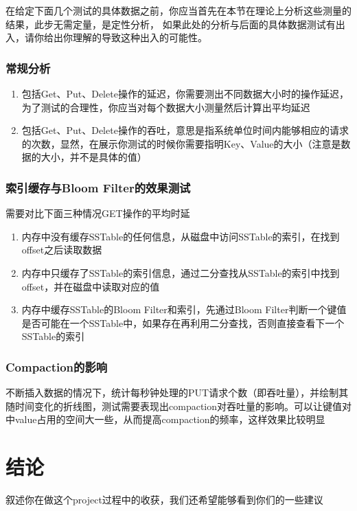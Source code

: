 \documentclass[fontset=windows]{article}
\begin{document}
在给定下面几个测试的具体数据之前，你应当首先在本节在理论上分析这些测量的结果，此步无需定量，是定性分析，
如果此处的分析与后面的具体数据测试有出入，请你给出你理解的导致这种出入的可能性。

\subsubsection{常规分析}


\begin{enumerate}
    \item 包括Get、Put、Delete操作的延迟，你需要测出不同数据大小时的操作延迟，为了测试的合理性，你应当对每个数据大小测量然后计算出平均延迟
    \item 包括Get、Put、Delete操作的吞吐，意思是指系统单位时间内能够相应的请求的次数，显然，在展示你测试的时候你需要指明Key、Value的大小（注意是数据的大小，并不是具体的值）
\end{enumerate}


\subsubsection{索引缓存与Bloom Filter的效果测试}
需要对比下面三种情况GET操作的平均时延
\begin{enumerate}
    \item 内存中没有缓存SSTable的任何信息，从磁盘中访问SSTable的索引，在找到offset之后读取数据
    \item 内存中只缓存了SSTable的索引信息，通过二分查找从SSTable的索引中找到offset，并在磁盘中读取对应的值
    \item 内存中缓存SSTable的Bloom Filter和索引，先通过Bloom Filter判断一个键值是否可能在一个SSTable中，如果存在再利用二分查找，否则直接查看下一个SSTable的索引
\end{enumerate}

\subsubsection{Compaction的影响}
不断插入数据的情况下，统计每秒钟处理的PUT请求个数（即吞吐量），并绘制其随时间变化的折线图，测试需要表现出compaction对吞吐量的影响。可以让键值对中value占用的空间大一些，从而提高compaction的频率，这样效果比较明显
\section{结论}
叙述你在做这个project过程中的收获，我们还希望能够看到你们的一些建议
\end{document}
